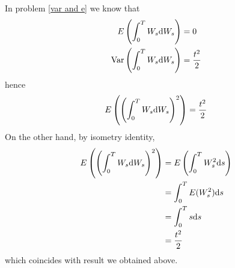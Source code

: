 \documentclass{homework}
\newcommand{\var}{\mathrm{Var}}
\begin{document}
    \problem
    In problem \ref{var and e} we know that
    \[\begin{aligned}
        E\left(\int_0^TW_s\diff W_s\right)&=0\\
        \var\left(\int_0^TW_s\diff W_s\right)&=\frac{t^2}{2}
    \end{aligned}\]
    hence
    \[E\left(\left(\int_0^TW_s\mathrm d W_s\right)^2\right)=\frac{t^2}{2}\]
    On the other hand, by isometry identity,
    \[\begin{aligned}
        E\left(\left(\int_0^TW_s\mathrm d W_s\right)^2\right)
        &=E\left(\int_0^TW_s^2\mathrm d s\right)\\
        &=\int_0^TE(W_s^2)\mathrm d s\\
        &=\int_0^Ts\mathrm d s\\
        &=\frac{t^2}{2}
    \end{aligned}\]
    which coincides with result we obtained above.
\end{document}
